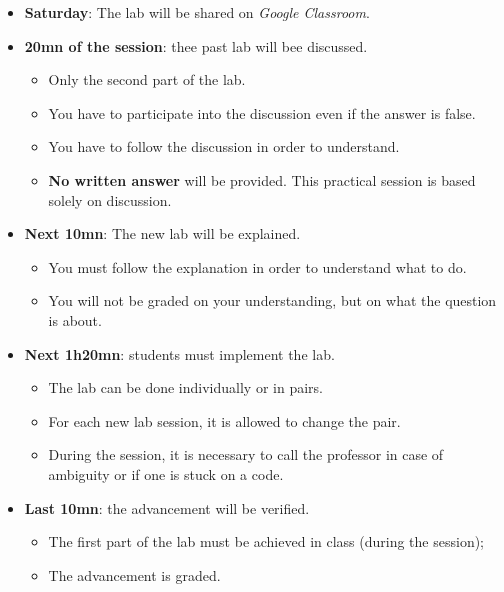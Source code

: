 \documentclass[11pt, a4paper]{article}
\begin{document}
\begin{itemize}
	\item \textbf{Saturday}: The lab will be shared on \textit{Google Classroom}. 
	
	\item \textbf{20mn of the session}: thee past lab will bee discussed.
	\begin{itemize}
		\item Only the second part of the lab.
		\item You have to participate into the discussion even if the answer is false.
		\item You have to follow the discussion in order to understand.
		\item \textbf{\color{red}No written answer} will be provided. This practical session is based solely on discussion.
	\end{itemize}

	\item \textbf{Next 10mn}: The new lab will be explained.
	\begin{itemize}
		\item You must follow the explanation in order to understand what to do.
		\item You will not be graded on your understanding, but on what the question is about.
	\end{itemize}
	
	\item \textbf{Next 1h20mn}: students must implement the lab.
	\begin{itemize}
		\item The lab can be done individually or in pairs.
		\item For each new lab session, it is allowed to change the pair.
		\item During the session, it is necessary to call the professor in case of ambiguity or if one is stuck on a code.
	\end{itemize}
	
	\item \textbf{Last 10mn}: the advancement will be verified.
	\begin{itemize}
		\item The first part of the lab must be achieved in class (during the session);
		\item The advancement is graded.
	\end{itemize}


\end{itemize}
\end{document}

